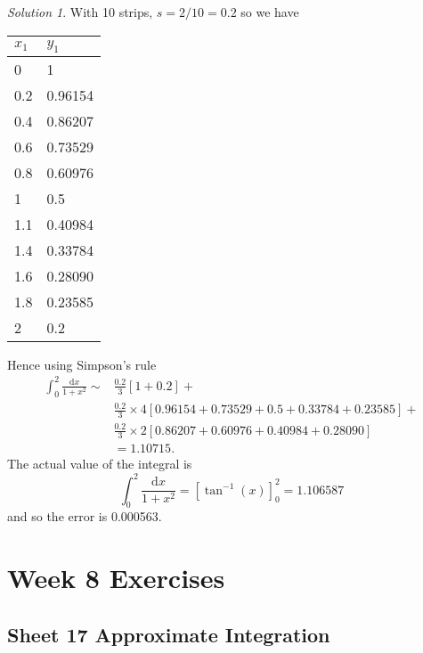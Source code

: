 \documentclass[
  11pt,
  oneside]{book}
\newcommand{\slide}{}
\theoremstyle{definition}
\theoremstyle{definition}
\theoremstyle{definition}
\theoremstyle{definition}
\theoremstyle{remark}
\newtheorem*{solution}{Solution}
\begin{document}
\begin{solution}
With 10 strips, \(s=2/10=0.2\) so we have

\begin{tabular}{l|l}
\hline
$x_1$ & $y_1$\\
\hline
0 & 1\\
\hline
0.2 & 0.96154\\
\hline
0.4 & 0.86207\\
\hline
0.6 & 0.73529\\
\hline
0.8 & 0.60976\\
\hline
1 & 0.5\\
\hline
1.1 & 0.40984\\
\hline
1.4 & 0.33784\\
\hline
1.6 & 0.28090\\
\hline
1.8 & 0.23585\\
\hline
2 & 0.2\\
\hline
\end{tabular}

Hence using Simpson's rule
\begin{align*}
\int_0^2\frac{\mathrm{d}x}{1+x^2} \sim& \frac{0.2}3\left[1 + 0.2\right] +\\
&\frac{0.2}3\times 4\left[0.96154+0.73529+0.5+0.33784+0.23585\right]+\\
&\frac{0.2}3\times 2\left[0.86207+0.60976+0.40984+0.28090\right]\\
&= 1.10715.
\end{align*}
The actual value of the integral is
\[
\int_0^2\frac{\mathrm{d}x}{1+x^2} = \left[\tan^{-1}(x)\right]_0^2 = 1.106587
\]
and so the error is 0.000563.
\end{solution}

\begin{slidesonly}

\hbox{}
\slide
\hbox{}
\slide
\hbox{}
\slide

\end{slidesonly}

\chapter*{Week 8 Exercises}\label{week-8-exercises}

\section{Sheet 17 Approximate Integration}\label{sheet-17-approximate-integration}
\end{document}

